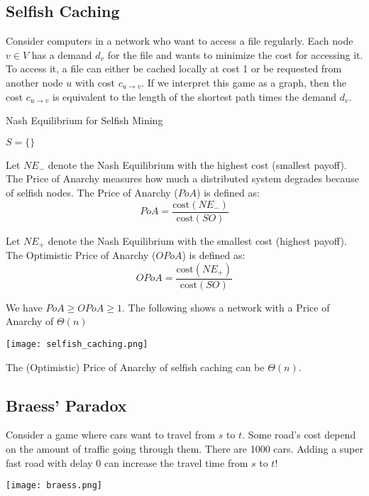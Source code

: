 \subsection{Selfish Caching}

Consider computers in a network who want to access a file regularly. Each node $v \in V$ has a demand $d_v$ for the file and wants to minimize the cost for accessing it. To access it, a file can either be cached locally at cost 1 or be requested from another node $u$ with cost $c_{u \to v}$. If we interpret this game as a graph, then the cost $c_{u \to v}$ is equivalent to the length of the shortest path times the demand $d_v$.\medskip

\begin{algorithm}[H]
\caption{Nash Equilibrium for Selfish Mining}
	$S = \{\}$ \\
\end{algorithm}
\medskip

Let $NE_−$ denote the Nash Equilibrium with the highest cost (smallest payoff). The Price of Anarchy measures how much a distributed system degrades because of selfish nodes. The Price of Anarchy ($PoA$) is defined as:
$$PoA = \frac{\text{cost}(NE_-)}{\text{cost}(SO)}$$

Let $NE_+$ denote the Nash Equilibrium with the smallest cost (highest payoff). The Optimistic Price of Anarchy ($OPoA$) is defined as:
$$OPoA = \frac{\text{cost}(NE_+)}{\text{cost}(SO)}$$

We have $PoA \geq OPoA \geq 1$. The following shows a network with a Price of Anarchy of $\Theta (n)$

\begin{center}
	\texttt{[image: selfish\_caching.png]}
\end{center}

The (Optimistic) Price of Anarchy of selfish caching can be $\Theta (n)$.


\subsection{Braess' Paradox}

Consider a game where cars want to travel from $s$ to $t$. Some road's cost depend on the amount of traffic going through them. There are 1000 cars. Adding a super fast road with delay 0 can increase the travel time from $s$ to $t$!
\begin{center}
	\texttt{[image: braess.png]}
\end{center}

